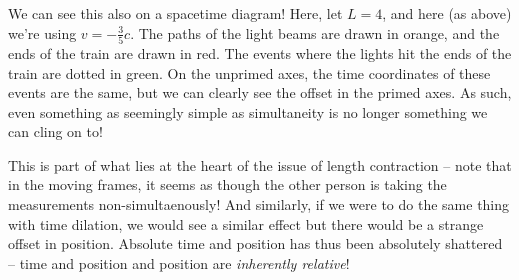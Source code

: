 \documentclass[12pt]{scrartcl}
\newcommand{\incfig}[2]{
    \def\svgscale{#1}
    
}
\begin{document}
We can see this also on a spacetime diagram! Here, let $L = 4$, and here (as above) we're using $v = -\frac 35 c$. The paths of the light beams are drawn in orange, and the ends of the train are drawn in red. The events where the lights hit the ends of the train are dotted in green. On the unprimed axes, the time coordinates of these events are the same, but we can clearly see the offset in the primed axes. As such, even something as seemingly simple as simultaneity is no longer something we can cling on to!
\begin{center}
	\incfig{2.5}{figures/simultan}
\end{center}
This is part of what lies at the heart of the issue of length contraction -- note that in the moving frames, it seems as though the other person is taking the measurements non-simultaenously! And similarly, if we were to do the same thing with time dilation, we would see a similar effect but there would be a strange offset in position. Absolute time and position has thus been absolutely shattered -- time and position and position are \textit{inherently relative}!
\end{document}

